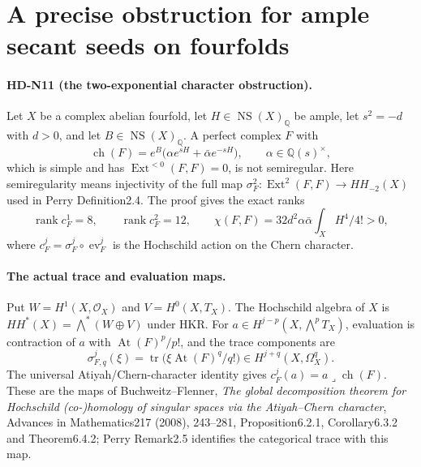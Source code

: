 \section{A precise obstruction for ample secant seeds on fourfolds}

\paragraph{HD-N11 (the two-exponential character obstruction).}
Let $X$ be a complex abelian fourfold, let $H\in\operatorname{NS}(X)_{\mathbb Q}$
be ample, let $s^2=-d$ with $d>0$, and let $B\in\operatorname{NS}(X)_{\mathbb Q}$.
A perfect complex $F$ with
\[
 \operatorname{ch}(F)=e^B\bigl(\alpha e^{sH}+\bar\alpha e^{-sH}\bigr),
 \qquad \alpha\in\mathbb Q(s)^\times,                         \tag{N11.1}
\]
which is simple and has $\operatorname{Ext}^{<0}(F,F)=0$, is not
semiregular. Here semiregularity means injectivity of the full map
$\sigma_F^2:\operatorname{Ext}^2(F,F)\to HH_{-2}(X)$ used in
Perry Definition2.4. The proof gives the exact ranks
\[
 \operatorname{rank}c_F^1=8,\qquad
 \operatorname{rank}c_F^2=12,\qquad
 \chi(F,F)=32d^2\alpha\bar\alpha\int_X H^4/4!>0,             \tag{N11.2}
\]
where $c_F^j=\sigma_F^j\circ\operatorname{ev}_F^j$ is the
Hochschild action on the Chern character.

\paragraph{The actual trace and evaluation maps.}
Put $W=H^1(X,\mathcal O_X)$ and $V=H^0(X,T_X)$. The Hochschild
algebra of $X$ is $HH^*(X)=\bigwedge^*(W\oplus V)$ under HKR.
For $a\in H^{j-p}(X,\bigwedge^p T_X)$, evaluation is contraction
of $a$ with $\operatorname{At}(F)^p/p!$, and the trace components
are
\[
 \sigma_{F,q}^j(\xi)=\operatorname{tr}
                 \bigl(\xi\operatorname{At}(F)^q/q!\bigr)
       \in H^{j+q}(X,\Omega_X^q).
\]
The universal Atiyah/Chern-character identity gives
$c_F^j(a)=a\mathbin{\lrcorner}\operatorname{ch}(F)$.
These are the maps of Buchweitz--Flenner,
\emph{The global decomposition theorem for Hochschild (co-)homology
of singular spaces via the Atiyah--Chern character},
Advances in Mathematics217 (2008), 243--281,
Proposition6.2.1, Corollary6.3.2 and Theorem6.4.2;
Perry Remark2.5 identifies the categorical trace with this map.

